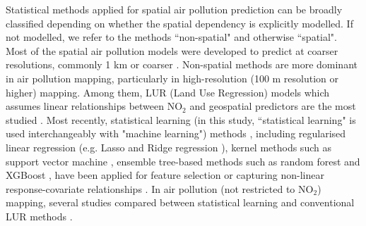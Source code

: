 \documentclass{article}
\begin{document}
Statistical methods applied for spatial air pollution prediction can be broadly classified depending on whether the spatial dependency is explicitly modelled. If not modelled, we refer to the methods ``non-spatial" and otherwise ``spatial". Most of the spatial air pollution models were developed to predict at coarser resolutions, commonly 1 km or coarser \citep{young2016satellite,shaddick2018data,BELOCONI2020105578}. Non-spatial methods are more dominant in air pollution mapping, particularly in high-resolution (100 m resolution or higher) mapping. Among them, LUR (Land Use Regression) models which assumes linear relationships between NO$_2$ and geospatial predictors are the most studied \citep{briggs2000regression,hoek2008review}. Most recently, statistical learning (in this study, ``statistical learning" is used interchangeably with "machine learning") methods \citep{hastie2009elements}, including regularised linear regression (e.g. Lasso and Ridge regression \citep{James2013introduction}), kernel methods such as support vector machine \citep{svm1999least}, ensemble tree-based methods such as random forest \citep[RF,][]{breiman2001random} and XGBoost \citep[XGB,][]{chen2016xgboost}, have been applied for feature selection or capturing non-linear response-covariate relationships \citep{luglobal,chen2019comparison}. In air pollution (not restricted to NO$_2$) mapping, several studies compared between statistical learning and conventional LUR methods  \citep{chen2019comparison,kerckhoffs2019performance,luglobal,REN2020105827,machinereview}.
\end{document}
